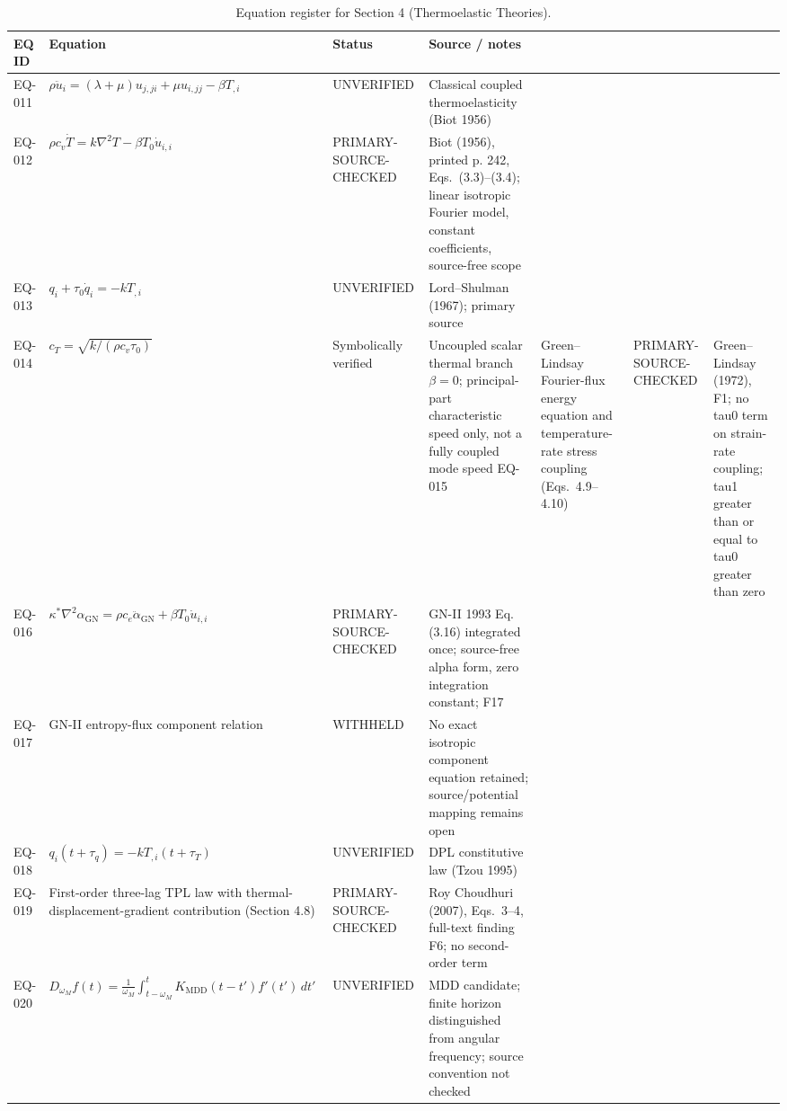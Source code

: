 \begin{table}[htbp]
\centering
\small
\setlength{\tabcolsep}{3pt}
\caption{Equation register for Section 4 (Thermoelastic Theories).}
\label{tab:appA-sec4}
\begin{tabularx}{\textwidth}{@{}p{1.6cm}Y p{2.8cm}Y@{}}
\toprule
\textbf{EQ ID} & \textbf{Equation} & \textbf{Status} & \textbf{Source / notes} \\
\midrule
EQ-011 & $\rho\ddot{u}_i = (\lambda+\mu)u_{j,ji} + \mu u_{i,jj} - \beta T_{,i}$ & UNVERIFIED & Classical coupled thermoelasticity (Biot 1956) \\
EQ-012 & $\rho c_v \dot{T} = k\nabla^2 T - \beta T_0 \dot{u}_{i,i}$ & PRIMARY-SOURCE-CHECKED & Biot (1956), printed p. 242, Eqs.~(3.3)--(3.4); linear isotropic Fourier model, constant coefficients, source-free scope \\
EQ-013 & $q_i + \tau_0\dot{q}_i = -kT_{,i}$ & UNVERIFIED & Lord--Shulman (1967); primary source \\
EQ-014 & $c_T = \sqrt{k/(\rho c_v\tau_0)}$ & Symbolically verified & Uncoupled scalar thermal branch $\beta=0$; principal-part characteristic speed only, not a fully coupled mode speed
EQ-015 & Green--Lindsay Fourier-flux energy equation and temperature-rate stress coupling (Eqs.~4.9--4.10) & PRIMARY-SOURCE-CHECKED & Green--Lindsay (1972), F1; no tau0 term on strain-rate coupling; tau1 greater than or equal to tau0 greater than zero \\
EQ-016 & $\kappa^*\nabla^2\alpha_{\mathrm{GN}} = \rho c_e\ddot{\alpha}_{\mathrm{GN}} + \beta T_0\dot{u}_{i,i}$ & PRIMARY-SOURCE-CHECKED & GN-II 1993 Eq. (3.16) integrated once; source-free alpha form, zero integration constant; F17 \\
EQ-017 & GN-II entropy-flux component relation & WITHHELD & No exact isotropic component equation retained; source/potential mapping remains open \\
EQ-018 & $q_i(t+\tau_q) = -kT_{,i}(t+\tau_T)$ & UNVERIFIED & DPL constitutive law (Tzou 1995) \\
EQ-019 & First-order three-lag TPL law with thermal-displacement-gradient contribution (Section 4.8) & PRIMARY-SOURCE-CHECKED & Roy Choudhuri (2007), Eqs.~3--4, full-text finding F6; no second-order term \\
EQ-020 & $D_{\omega_M} f(t) = \tfrac{1}{\omega_M}\int_{t-\omega_M}^{t}K_{\mathrm{MDD}}(t-t')f'(t')\,dt'$ & UNVERIFIED & MDD candidate; finite horizon distinguished from angular frequency; source convention not checked \\

\end{tabularx}
\end{table}
